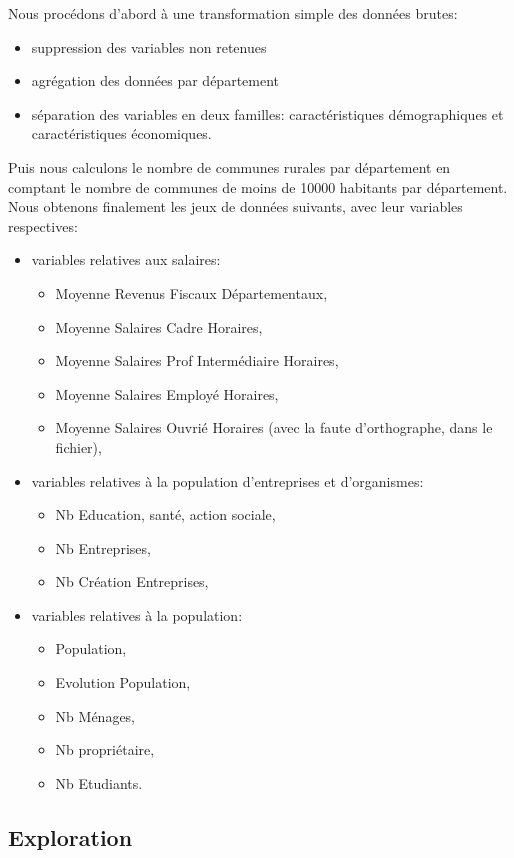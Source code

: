 \documentclass[a4paper,11pt]{article}
\begin{document}
Nous procédons d'abord à une transformation simple des données brutes:
\begin{itemize}
\item suppression des variables non retenues
\item agrégation des données par département
\item séparation des variables en deux familles: caractéristiques démographiques et caractéristiques économiques.
\end{itemize}
Puis nous calculons le nombre de communes rurales par département en comptant le nombre de communes de moins de 10000 habitants par département.
Nous obtenons finalement les jeux de données suivants, avec leur variables respectives:
\begin{itemize}
\item variables relatives aux salaires: 
	\begin{itemize}
	\item Moyenne Revenus Fiscaux Départementaux,
    \item Moyenne Salaires Cadre Horaires,
    \item Moyenne Salaires Prof Intermédiaire Horaires,
    \item Moyenne Salaires Employé Horaires,
    \item Moyenne Salaires Ouvrié Horaires (avec la faute d'orthographe, dans le fichier),
	\end{itemize}
\item variables relatives à la population d'entreprises et d'organismes:
	\begin{itemize}
	\item Nb Education, santé, action sociale,
	\item Nb Entreprises,
	\item Nb Création Entreprises,
	\end{itemize}
\item variables relatives à la population:
	\begin{itemize}
	\item Population,
	\item Evolution Population,
	\item Nb Ménages,
	\item Nb propriétaire,
	\item Nb Etudiants.
	\end{itemize}
\end{itemize}


\subsection{Exploration}
\end{document}
